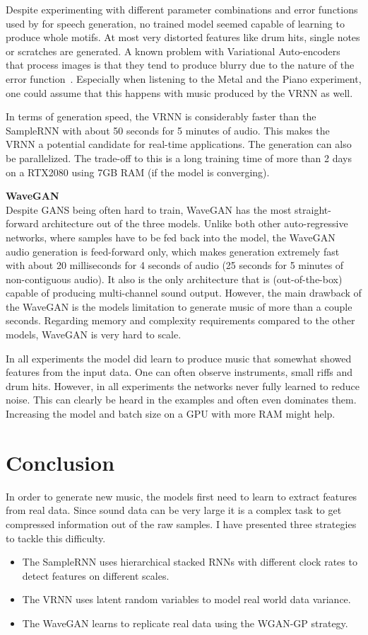 \documentclass[12pt]{article}
\begin{document}
Despite experimenting with different parameter combinations and error functions used by \cite{chung2015recurrent} for speech generation, no trained model seemed capable of learning to produce whole motifs. 
At most very distorted features like drum hits, single notes or scratches are generated.
A known problem with Variational Auto-encoders that process images is that they tend to produce blurry due to the nature of the error function~\cite{larsen2015autoencoding}.
Especially when listening to the Metal and the Piano experiment, one could assume that this happens with music produced by the VRNN as well.

In terms of generation speed, the VRNN is considerably faster than the SampleRNN with about 50 seconds for 5 minutes of audio.
This makes the VRNN a potential candidate for real-time applications.
The generation can also be parallelized.
The trade-off to this is a long training time of more than 2 days on a RTX2080 using 7GB RAM (if the model is converging).


\textbf{WaveGAN}\\
Despite GANS being often hard to train, WaveGAN has the most straight-forward architecture out of the three models.
Unlike both other auto-regressive networks, where samples have to be fed back into the model, the WaveGAN audio generation is feed-forward only, which makes generation extremely fast with about 20 milliseconds for 4 seconds of audio (25 seconds for 5 minutes of non-contiguous audio).
It also is the only architecture that is (out-of-the-box) capable of producing multi-channel sound output.
However, the main drawback of the WaveGAN is the models limitation to generate music of more than a couple seconds.
Regarding memory and complexity requirements compared to the other models, WaveGAN is very hard to scale.

In all experiments the model did learn to produce music that somewhat showed features from the input data.
One can often observe instruments, small riffs and drum hits.
However, in all experiments the networks never fully learned to reduce noise.
This can clearly be heard in the examples and often even dominates them.
Increasing the model and batch size on a GPU with more RAM might help.



\section{Conclusion}
In order to generate new music, the models first need to learn to extract features from real data.
Since sound data can be very large it is a complex task to get compressed information out of the raw samples.
I have presented three strategies to tackle this difficulty.
\begin{itemize}
 \item The SampleRNN uses hierarchical stacked RNNs with different clock rates to detect features on different scales.
 \item The VRNN uses latent random variables to model real world data variance.
 \item The WaveGAN learns to replicate real data using the WGAN-GP strategy.
\end{itemize}
\end{document}
